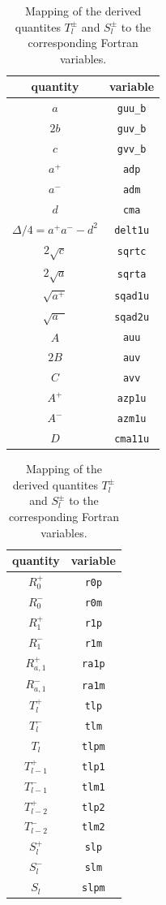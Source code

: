 \begin{table}[htb]
  \centering
  \begin{tabular}[t]{ c | c }
    quantity & variable \\
    \hline
    $a$  & \texttt{guu\_b} \\
    $2b$ & \texttt{guv\_b} \\
    $c$  & \texttt{gvv\_b} \\
    \hline
    $a^{+}$ & \texttt{adp} \\
    $a^{-}$ & \texttt{adm} \\
    $d$     & \texttt{cma} \\
    $\Delta/4 = a^{+}a^{-}-d^2$ & \texttt{delt1u} \\
    \hline
    $2\sqrt{c}$  & \texttt{sqrtc} \\
    $2\sqrt{a}$  & \texttt{sqrta} \\
    $\sqrt{a^{+}}$ & \texttt{sqad1u} \\
    $\sqrt{a^{-}}$ & \texttt{sqad2u} \\
    \hline
    $A$  & \texttt{auu} \\
    $2B$ & \texttt{auv} \\
    $C$  & \texttt{avv} \\
    \hline
    $A^{+}$  & \texttt{azp1u} \\
    $A^{-}$  & \texttt{azm1u} \\
    $D$  & \texttt{cma11u}
    \end{tabular}
    \hspace{2cm}
    \begin{tabular}[t]{ c | c }
    quantity & variable \\
    \hline
    $R^{+}_0$ & \texttt{r0p} \\
    $R^{-}_0$ & \texttt{r0m} \\
    $R^{+}_1$ & \texttt{r1p} \\
    $R^{-}_1$ & \texttt{r1m} \\
    $R^{+}_{a,1}$ & \texttt{ra1p} \\
    $R^{-}_{a,1}$ & \texttt{ra1m} \\
    \hline
    $T^{+}_l$ & \texttt{tlp} \\
    $T^{-}_l$ & \texttt{tlm} \\
    $T_l$ & \texttt{tlpm} \\
    $T^{+}_{l-1}$ & \texttt{tlp1} \\
    $T^{-}_{l-1}$ & \texttt{tlm1} \\
    $T^{+}_{l-2}$ & \texttt{tlp2} \\
    $T^{-}_{l-2}$ & \texttt{tlm2} \\
    \hline
    $S^{+}_l$ & \texttt{slp} \\
    $S^{-}_l$ & \texttt{slm} \\
    $S_l$ & \texttt{slpm}
  \end{tabular}
  \caption{Mapping of the derived quantites $T^{\pm}_l$ and $S^{\pm}_l$ to the corresponding Fortran variables.}
  \label{tab:T_pm_S_pm}
\end{table}

